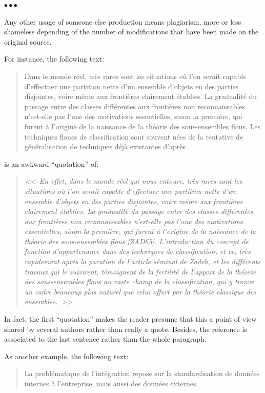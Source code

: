 \documentclass[11pt, english, screen, research-development]{report-rd-info}
\newenvironment{explanation}
{\color{blue}
 \begin{list}{}{\hspace{0.2\textwidth}\color{blue}}\item $\bullet\bullet\bullet$
}
{\end{list}}
\begin{document}
\begin{explanation}
   Any other usage of someone else production means plagiarism, more or less shameless depending of the number of modifications that have been made on the original source.

   For instance, the following text:
   \begin{quote}
      Dans le monde réel, très rares sont les situations où l'on serait capable d'effectuer une partition nette d'un ensemble d'objets en des parties disjointes, voire même aux frontières clairement établies.
   La gradualité du passage entre des classes différentes aux frontières non reconnaissables n'est-elle pas l'une des motivations essentielles, sinon la première, qui furent à l'origine de la naissance de la théorie des sous-ensembles flous.
   Les techniques floues de classification sont souvent nées de la tentative de généralisation de techniques déjà existantes d'après \cite{Khodja-97}.
   \end{quote}
   is an awkward ``quotation'' of:
   \begin{quote}
      \emph{<<~En effet, dans le monde réel qui nous entoure, très rares sont les situations où l'on serait capable d'effectuer une partition nette d'un ensemble d'objets en des parties disjointes, voire même aux frontières clairement établies.
      La gradualité du passage entre des classes différentes aux frontières non reconnaissables n'est-elle pas l'une des motivations essentielles, sinon la première, qui furent à l'origine de la naissance de la théorie des sous-ensembles flous [ZAD65].
      L'introduction du concept de fonction d'appartenance dans des techniques de classification, et ce, très rapidement après la parution de l'article séminal de Zadeh, et les différents travaux qui le suivirent, témoignent de la fertilité de l'apport de la théorie des sous-ensembles flous au vaste champ de la classification, qui y trouve un cadre beaucoup plus naturel que celui offert par la théorie classique des ensembles.~>>} \cite{Khodja-97}
   \end{quote}

   In fact, the first ``quotation'' makes the reader presume that this a point of view shared by several authors rather than really a quote.
   Besides, the reference is associated to the last sentence rather than the whole paragraph.

   \bigskip

   As another example, the following text:
   \begin{quote}
   La problématique de l'intégration repose sur la standardisation de données internes à l'entreprise, mais aussi des données externes.


\end{quote}
\end{explanation}
\end{document}
